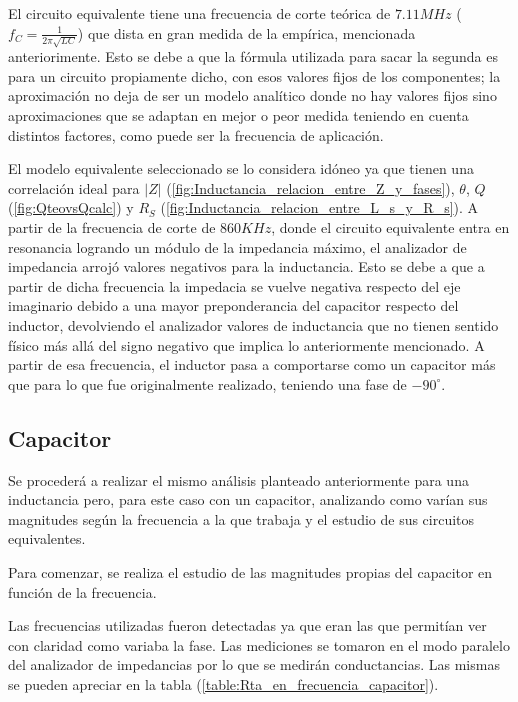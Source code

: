 El circuito equivalente tiene una frecuencia de corte teórica de $7.11MHz$ ($f_C=\frac{1}{2\pi\sqrt{LC}}$) que dista en gran medida de la empírica, mencionada anteriorimente. Esto se debe a que la fórmula utilizada para sacar la segunda es para un circuito propiamente dicho, con esos valores fijos de los componentes; la aproximación no deja de ser un modelo analítico donde no hay valores fijos sino aproximaciones que se adaptan en mejor o peor medida teniendo en cuenta distintos factores, como puede ser la frecuencia de aplicación.\par
El modelo equivalente seleccionado se lo considera idóneo ya que tienen una correlación ideal para $|Z|$ (\ref{fig:Inductancia_relacion_entre_Z_y_fases}), $\theta$, $Q$(\ref{fig:QteovsQcalc}) y $R_S$ (\ref{fig:Inductancia_relacion_entre_L_s_y_R_s}). A partir de la frecuencia de corte de $860KHz$, donde el circuito equivalente entra en resonancia logrando un módulo de la impedancia máximo, el analizador de impedancia arrojó valores negativos para la inductancia. Esto se debe a que a partir de dicha frecuencia la impedacia se vuelve negativa respecto del eje imaginario debido a una mayor preponderancia del capacitor respecto del inductor, devolviendo el analizador valores de inductancia que no tienen sentido físico más allá del signo negativo que implica lo anteriormente mencionado. A partir de esa frecuencia, el inductor pasa a comportarse como un capacitor más que para lo que fue originalmente realizado, teniendo una fase de $-90^\circ$.\par \par

\subsection{Capacitor}
Se procederá a realizar el mismo análisis planteado anteriormente para una inductancia pero, para este caso con un capacitor, analizando como varían sus magnitudes según la frecuencia a la que trabaja y el estudio de sus circuitos equivalentes.

Para comenzar, se realiza el estudio de las magnitudes propias del capacitor en función de la frecuencia. \par Las frecuencias utilizadas fueron detectadas ya que eran las que permitían ver con claridad como variaba la fase. Las mediciones se tomaron en el modo paralelo del analizador de impedancias por lo que se medirán conductancias. Las mismas se pueden apreciar en la tabla (\ref{table:Rta_en_frecuencia_capacitor}).


